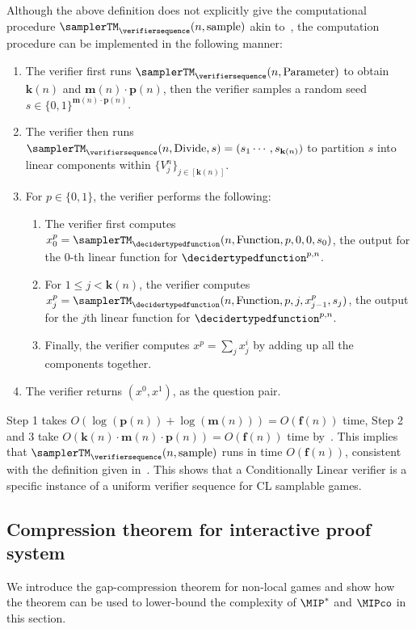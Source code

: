 Although the above definition does not explicitly give the computational procedure $\samplerTM_{\verifiersequence}(n, \text{sample})$ akin to~, the computation procedure can be implemented in the following manner:
\begin{enumerate}
	\item The verifier first runs $\samplerTM_{\verifiersequence}(n, \text{Parameter})$ to obtain $\mathbf{k}(n)$ and $\mathbf{m}(n) \cdot \mathbf{p}(n)$, then the verifier samples a random seed $s \in \{0,1\}^{\mathbf{m}(n) \cdot \mathbf{p}(n)}$. 
	\item The verifier then runs $\samplerTM_{\verifiersequence}(n, \text{Divide},s) = (s_1 \cdots , s_{\mathbf{k}(n)})$ to partition $s$ into linear components within $\{V_j^n\}_{j\in [\mathbf{k}(n)]}$.
	\item For $p \in \{0,1\}$, the verifier performs the following: 
	\begin{enumerate}
		\item The verifier first computes $x_0^p =  \samplerTM_\decidertypedfunction(n, \text{Function},p,0,0, s_0)$, the output for the $0$-th linear function for $\decidertypedfunction^{p,n}$.
		\item For $1 \leq j < \mathbf{k}(n)$, the verifier computes $x_j^p =  \samplerTM_\decidertypedfunction(n, \text{Function},p,j,x_{j-1}^p, s_j)$, the output for the $j$th linear function for $\decidertypedfunction^{p,n}$.
		\item Finally, the verifier computes $x^p = \sum_{j} x_j^i $ by adding up all the components together.
	\end{enumerate}
	\item The verifier returns $(x^0, x^1)$, as the question pair. 
\end{enumerate}
Step 1 takes $O(\log(\mathbf{p}(n)) + \log(\mathbf{m}(n))) = O(\mathbf{f}(n))$ time, Step 2 and 3 take $O(\mathbf{k}(n) \cdot \mathbf{m}(n) \cdot \mathbf{p}(n)) = O(\mathbf{f}(n))$ time by~. This implies that $\samplerTM_{\verifiersequence}(n, \text{sample})$ runs in time $O(\mathbf{f}(n))$, consistent with the definition given in~. This shows that a Conditionally Linear verifier is a specific instance of a uniform verifier sequence for CL samplable games.  



\subsection{Compression theorem for interactive proof system}
We introduce the gap-compression theorem for non-local games and show how the theorem can be used to lower-bound the complexity of $\MIP^*$ and $\MIPco$ in this section. 

